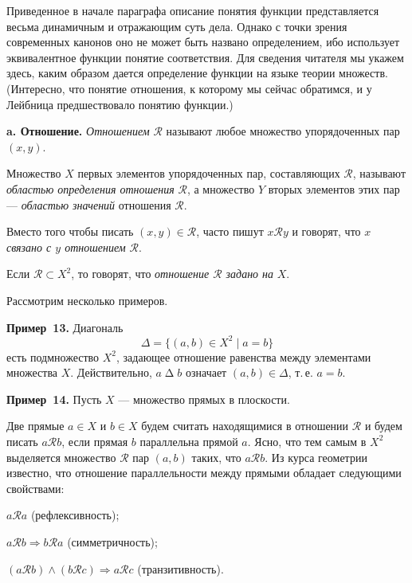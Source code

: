 Приведенное в начале параграфа описание понятия функции представляется весьма динамичным и отражающим суть дела. Однако с точки зрения
современных канонов оно не может быть названо определением, ибо использует эквивалентное функции понятие соответствия. Для сведения читателя мы укажем здесь, каким образом дается определение функции на языке
теории множеств. (Интересно, что понятие отношения, к которому мы сейчас обратимся, и у Лейбница предшествовало понятию функции.)

\medskip

\textbf{a. Отношение.} \textit{Отношением} $\mathscr{R}$ называют любое множество упорядоченных пар $(x, y)$.

Множество $X$ первых элементов упорядоченных пар, составляющих $\mathscr{R}$,
называют \textit{областью определения отношения} $\mathscr{R}$, а множество $Y$ вторых элементов этих пар --- \textit{областью значений} отношения $\mathscr{R}$.

Вместо того чтобы писать $(x, y) \in \mathscr{R}$, часто пишут $x \mathrel{\mathscr{R}} y$ и говорят, что $x$
\textit{связано с $y$ отношением} $\mathscr{R}$.

Если $\mathscr{R} \subset X^2$, то говорят, что \textit{отношение $\mathscr{R}$ задано на} $X$.

Рассмотрим несколько примеров.

\medskip

\textbf{Пример~13.} Диагональ
\[
  \Delta = \{(a, b) \in X^2 \mid a = b\}
\]
есть подмножество $X^2$, задающее отношение равенства между элементами
множества $X$. Действительно, $a \mathrel{\Delta} b$ означает $(a, b) \in \Delta$, т.\,е. $a = b$.

\textbf{Пример~14.} Пусть $X$ --- множество прямых в плоскости.

Две прямые $a \in X$ и $b \in X$ будем считать находящимися в отношении $\mathscr{R}$
и будем писать $a \mathrel{\mathscr{R}} b$, если прямая $b$ параллельна прямой $a$. Ясно, что тем
самым в $X^2$ выделяется множество $\mathscr{R}$ пар $(a, b)$ таких, что $a \mathrel{\mathscr{R}} b$. Из курса
геометрии известно, что отношение параллельности между прямыми обладает следующими свойствами:

$a \mathrel{\mathscr{R}} a$ (рефлексивность);

$a \mathrel{\mathscr{R}} b \Rightarrow b \mathrel{\mathscr{R}} a$ (симметричность);

$(a \mathrel{\mathscr{R}} b) \land (b \mathrel{\mathscr{R}} c) \Rightarrow a \mathrel{\mathscr{R}} c$ (транзитивность).

